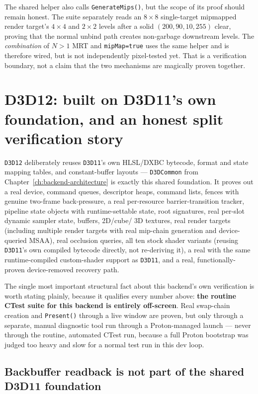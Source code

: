 The shared helper also calls \texttt{GenerateMips()}, but the scope of its proof should remain
honest. The suite separately reads an \(8\times8\) single-target mipmapped render target's
\(4\times4\) and \(2\times2\) levels after a solid \((200,90,10,255)\) clear, proving that the
normal unbind path creates non-garbage downstream levels. The \emph{combination} of \(N>1\)
MRT and \texttt{mipMap=true} uses the same helper and is therefore wired, but is not independently
pixel-tested yet. That is a verification boundary, not a claim that the two mechanisms are
magically proven together.

\section{D3D12: built on D3D11's own foundation, and an honest split verification story}

\texttt{D3D12} deliberately reuses \texttt{D3D11}'s own HLSL/DXBC bytecode, format and state
mapping tables, and constant-buffer layouts --- \texttt{D3DCommon} from
Chapter~\ref{ch:backend-architecture} is exactly this shared foundation. It proves out a real
device, command queues, descriptor heaps, command lists, fences with genuine two-frame
back-pressure, a real per-resource barrier-transition tracker, pipeline state objects with
runtime-settable state, root signatures, real per-slot dynamic sampler state, buffers, 2D/cube/%
3D textures, real render targets (including multiple render targets with real mip-chain
generation and device-queried MSAA), real occlusion queries, all ten stock shader variants
(reusing \texttt{D3D11}'s own compiled bytecode directly, not re-deriving it), a real
 with the same runtime-compiled custom-shader support as
\texttt{D3D11}, and a real, functionally-proven device-removed recovery path.

The single most important structural fact about this backend's own verification is worth
stating plainly, because it qualifies every number above: \textbf{the routine CTest suite for
this backend is entirely off-screen}. Real swap-chain creation and \texttt{Present()} through
a live window are proven, but only through a separate, manual diagnostic tool run through a
Proton-managed launch --- never through the routine, automated CTest run, because a full
Proton bootstrap was judged too heavy and slow for a normal test run in this dev loop.

\subsection{Backbuffer readback is not part of the shared D3D11 foundation}

